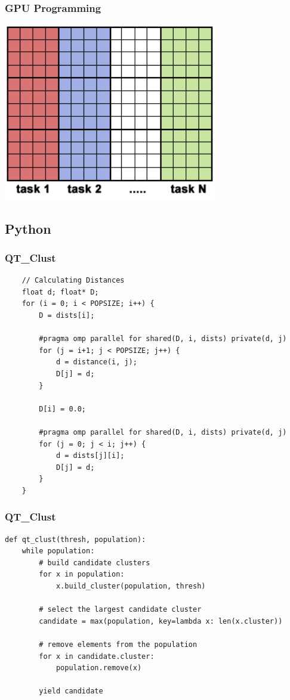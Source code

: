 \documentclass[t]{beamer}
\begin{document}
\begin{frame}
\frametitle{GPU Programming}
\begin{center}
  \includegraphics[width=0.7\textwidth]{img/array.png} 
\end{center}
\end{frame}

\subsection{Python}
\begin{frame}[fragile]
\frametitle{QT\_Clust}
\begin{verbatim}
    // Calculating Distances
    float d; float* D;
    for (i = 0; i < POPSIZE; i++) {
        D = dists[i];

        #pragma omp parallel for shared(D, i, dists) private(d, j)
        for (j = i+1; j < POPSIZE; j++) {
            d = distance(i, j);
            D[j] = d;
        }
        
        D[i] = 0.0;
        
        #pragma omp parallel for shared(D, i, dists) private(d, j)
        for (j = 0; j < i; j++) {
            d = dists[j][i];
            D[j] = d;
        }
    }
\end{verbatim}
\end{frame}

\begin{frame}[fragile]
\frametitle{QT\_Clust}
\begin{verbatim}
def qt_clust(thresh, population):
    while population:
        # build candidate clusters
        for x in population:
            x.build_cluster(population, thresh)
    
        # select the largest candidate cluster
        candidate = max(population, key=lambda x: len(x.cluster))
  
        # remove elements from the population
        for x in candidate.cluster:
            population.remove(x)
    
        yield candidate
\end{verbatim}
\end{frame}
\end{document}
